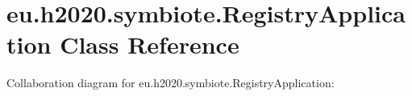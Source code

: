 \hypertarget{classeu_1_1h2020_1_1symbiote_1_1RegistryApplication}{}\section{eu.\+h2020.\+symbiote.\+Registry\+Application Class Reference}
\label{classeu_1_1h2020_1_1symbiote_1_1RegistryApplication}


Collaboration diagram for eu.\+h2020.\+symbiote.\+Registry\+Application\+:
